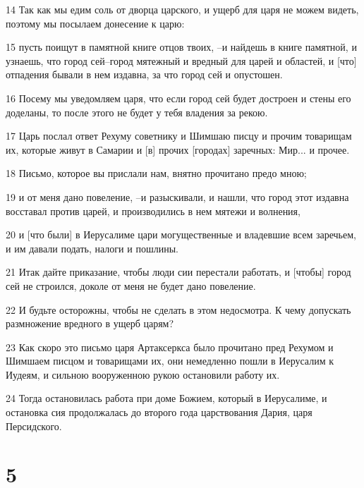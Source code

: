 \par 14 Так как мы едим соль от дворца царского, и ущерб для царя не можем видеть, поэтому мы посылаем донесение к царю:
\par 15 пусть поищут в памятной книге отцов твоих, --и найдешь в книге памятной, и узнаешь, что город сей--город мятежный и вредный для царей и областей, и [что] отпадения бывали в нем издавна, за что город сей и опустошен.
\par 16 Посему мы уведомляем царя, что если город сей будет достроен и стены его доделаны, то после этого не будет у тебя владения за рекою.
\par 17 Царь послал ответ Рехуму советнику и Шимшаю писцу и прочим товарищам их, которые живут в Самарии и [в] прочих [городах] заречных: Мир... и прочее.
\par 18 Письмо, которое вы прислали нам, внятно прочитано предо мною;
\par 19 и от меня дано повеление, --и разыскивали, и нашли, что город этот издавна восставал против царей, и производились в нем мятежи и волнения,
\par 20 и [что были] в Иерусалиме цари могущественные и владевшие всем заречьем, и им давали подать, налоги и пошлины.
\par 21 Итак дайте приказание, чтобы люди сии перестали работать, и [чтобы] город сей не строился, доколе от меня не будет дано повеление.
\par 22 И будьте осторожны, чтобы не сделать в этом недосмотра. К чему допускать размножение вредного в ущерб царям?
\par 23 Как скоро это письмо царя Артаксеркса было прочитано пред Рехумом и Шимшаем писцом и товарищами их, они немедленно пошли в Иерусалим к Иудеям, и сильною вооруженною рукою остановили работу их.
\par 24 Тогда остановилась работа при доме Божием, который в Иерусалиме, и остановка сия продолжалась до второго года царствования Дария, царя Персидского.

\chapter{5}

